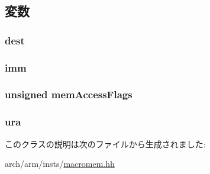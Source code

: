 \subsection{変数}
\hypertarget{classArmISA_1_1MicroNeonMemOp_a6563276134c2f303bab0c30e83e02220}{
\subsubsection[{dest}]{ {\bf dest}}}
\label{classArmISA_1_1MicroNeonMemOp_a6563276134c2f303bab0c30e83e02220}
\hypertarget{classArmISA_1_1MicroNeonMemOp_a3aa9e175bd81b38df0e566643d5d4f8d}{
\subsubsection[{imm}]{ {\bf imm}}}
\label{classArmISA_1_1MicroNeonMemOp_a3aa9e175bd81b38df0e566643d5d4f8d}
\hypertarget{classArmISA_1_1MicroNeonMemOp_a827c936c9e2b1f1cf21a01f204a8d821}{
\subsubsection[{memAccessFlags}]{\setlength{\rightskip}{0pt plus 5cm}unsigned {\bf memAccessFlags}}}
\label{classArmISA_1_1MicroNeonMemOp_a827c936c9e2b1f1cf21a01f204a8d821}
\hypertarget{classArmISA_1_1MicroNeonMemOp_a8e6cd3e234a4950e7a1a05f1b24cfee0}{
\subsubsection[{ura}]{ {\bf ura}}}
\label{classArmISA_1_1MicroNeonMemOp_a8e6cd3e234a4950e7a1a05f1b24cfee0}


このクラスの説明は次のファイルから生成されました:\begin{DoxyCompactItemize}
\item 
arch/arm/insts/\hyperlink{macromem_8hh}{macromem.hh}\end{DoxyCompactItemize}
